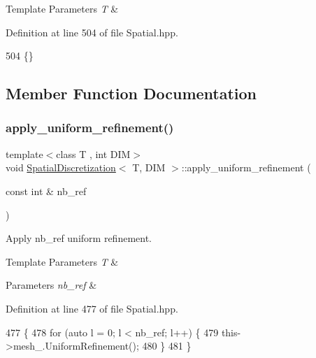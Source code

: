 \begin{DoxyTemplParams}{Template Parameters}
{\em T} & \\
\hline
\end{DoxyTemplParams}


Definition at line 504 of file Spatial.\+hpp.


\begin{DoxyCode}
504 \{\}
\end{DoxyCode}


\subsection{Member Function Documentation}
\mbox{\label{classSpatialDiscretization_a3463c09a77a0c6563a353d97cf56dfa4}} 
\subsubsection{\texorpdfstring{apply\+\_\+uniform\+\_\+refinement()}{apply\_uniform\_refinement()}}
{\footnotesize\ttfamily template$<$class T , int D\+IM$>$ \\
void \hyperlink{classSpatialDiscretization}{Spatial\+Discretization}$<$ T, D\+IM $>$\+::apply\+\_\+uniform\+\_\+refinement (\begin{DoxyParamCaption}\item[{const int \&}]{nb\+\_\+ref }\end{DoxyParamCaption})}



Apply nb\+\_\+ref uniform refinement. 


\begin{DoxyTemplParams}{Template Parameters}
{\em T} & \\
\hline
\end{DoxyTemplParams}

\begin{DoxyParams}{Parameters}
{\em nb\+\_\+ref} & \\
\hline
\end{DoxyParams}


Definition at line 477 of file Spatial.\+hpp.


\begin{DoxyCode}
477                                                                               \{
478   \textcolor{keywordflow}{for} (\textcolor{keyword}{auto} l = 0; l < nb\_ref; l++) \{
479     this->mesh\_.UniformRefinement();
480   \}
481 \}
\end{DoxyCode}
\mbox{\label{classSpatialDiscretization_a8d69dd3c7e36327396e626b27d98f96f}} 
